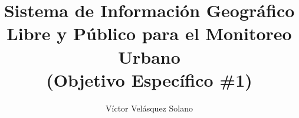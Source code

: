 \documentclass{article}
\begin{document}
\pagestyle{monstyle}
\title{Sistema de Información Geográfico Libre y Público para el Monitoreo Urbano\\
  (Objetivo Específico \#1)}
\author{Víctor Velásquez Solano}
\maketitle
\tableofcontents





\end{document}

